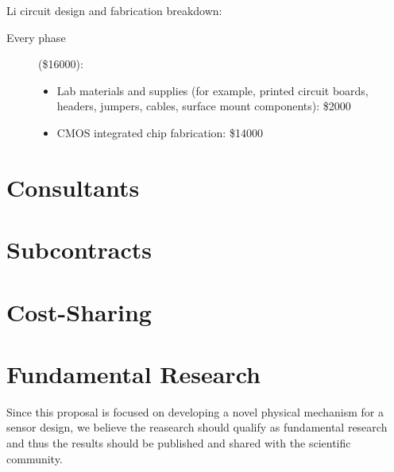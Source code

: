 Li circuit design and fabrication breakdown:
\begin{description}
\item [Every phase] (\$16000):
  \begin{itemize}
  \item Lab materials and supplies (for example, printed circuit boards, headers, jumpers, cables, surface mount components): \$2000
  \item CMOS integrated chip fabrication: \$14000
  \end{itemize}
\end{description}

\section{Consultants}
\section{Subcontracts}
\section{Cost-Sharing}
\section{Fundamental Research}
Since this proposal is focused on developing a novel physical mechanism for a sensor design, we believe the reasearch should qualify as fundamental research and thus the results should be published and shared with the scientific community.

